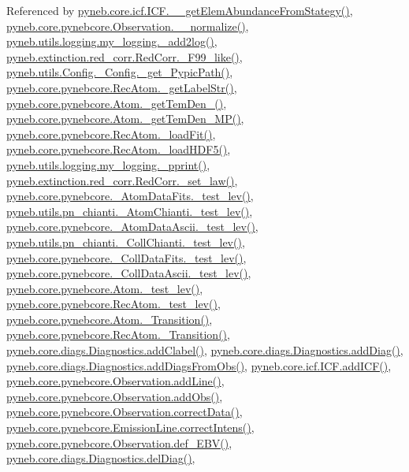 Referenced by \hyperlink{icf_8py_source_l01075}{pyneb.\-core.\-icf.\-I\-C\-F.\-\_\-\-\_\-get\-Elem\-Abundance\-From\-Stategy()}, \hyperlink{pynebcore_8py_source_l04007}{pyneb.\-core.\-pynebcore.\-Observation.\-\_\-\-\_\-normalize()}, \hyperlink{logging_8py_source_l00059}{pyneb.\-utils.\-logging.\-my\-\_\-logging.\-\_\-add2log()}, \hyperlink{red__corr_8py_source_l00658}{pyneb.\-extinction.\-red\-\_\-corr.\-Red\-Corr.\-\_\-\-F99\-\_\-like()}, \hyperlink{_config_8py_source_l00115}{pyneb.\-utils.\-Config.\-\_\-\-Config.\-\_\-get\-\_\-\-Pypic\-Path()}, \hyperlink{pynebcore_8py_source_l02970}{pyneb.\-core.\-pynebcore.\-Rec\-Atom.\-\_\-get\-Label\-Str()}, \hyperlink{pynebcore_8py_source_l01869}{pyneb.\-core.\-pynebcore.\-Atom.\-\_\-get\-Tem\-Den\-\_()}, \hyperlink{pynebcore_8py_source_l02046}{pyneb.\-core.\-pynebcore.\-Atom.\-\_\-get\-Tem\-Den\-\_\-\-M\-P()}, \hyperlink{pynebcore_8py_source_l02754}{pyneb.\-core.\-pynebcore.\-Rec\-Atom.\-\_\-load\-Fit()}, \hyperlink{pynebcore_8py_source_l02714}{pyneb.\-core.\-pynebcore.\-Rec\-Atom.\-\_\-load\-H\-D\-F5()}, \hyperlink{logging_8py_source_l00051}{pyneb.\-utils.\-logging.\-my\-\_\-logging.\-\_\-pprint()}, \hyperlink{red__corr_8py_source_l00176}{pyneb.\-extinction.\-red\-\_\-corr.\-Red\-Corr.\-\_\-set\-\_\-law()}, \hyperlink{pynebcore_8py_source_l00178}{pyneb.\-core.\-pynebcore.\-\_\-\-Atom\-Data\-Fits.\-\_\-test\-\_\-lev()}, \hyperlink{pn__chianti_8py_source_l00304}{pyneb.\-utils.\-pn\-\_\-chianti.\-\_\-\-Atom\-Chianti.\-\_\-test\-\_\-lev()}, \hyperlink{pynebcore_8py_source_l00447}{pyneb.\-core.\-pynebcore.\-\_\-\-Atom\-Data\-Ascii.\-\_\-test\-\_\-lev()}, \hyperlink{pn__chianti_8py_source_l00472}{pyneb.\-utils.\-pn\-\_\-chianti.\-\_\-\-Coll\-Chianti.\-\_\-test\-\_\-lev()}, \hyperlink{pynebcore_8py_source_l00677}{pyneb.\-core.\-pynebcore.\-\_\-\-Coll\-Data\-Fits.\-\_\-test\-\_\-lev()}, \hyperlink{pynebcore_8py_source_l01045}{pyneb.\-core.\-pynebcore.\-\_\-\-Coll\-Data\-Ascii.\-\_\-test\-\_\-lev()}, \hyperlink{pynebcore_8py_source_l01525}{pyneb.\-core.\-pynebcore.\-Atom.\-\_\-test\-\_\-lev()}, \hyperlink{pynebcore_8py_source_l02672}{pyneb.\-core.\-pynebcore.\-Rec\-Atom.\-\_\-test\-\_\-lev()}, \hyperlink{pynebcore_8py_source_l01433}{pyneb.\-core.\-pynebcore.\-Atom.\-\_\-\-Transition()}, \hyperlink{pynebcore_8py_source_l02812}{pyneb.\-core.\-pynebcore.\-Rec\-Atom.\-\_\-\-Transition()}, \hyperlink{diags_8py_source_l00410}{pyneb.\-core.\-diags.\-Diagnostics.\-add\-Clabel()}, \hyperlink{diags_8py_source_l00246}{pyneb.\-core.\-diags.\-Diagnostics.\-add\-Diag()}, \hyperlink{diags_8py_source_l00353}{pyneb.\-core.\-diags.\-Diagnostics.\-add\-Diags\-From\-Obs()}, \hyperlink{icf_8py_source_l00797}{pyneb.\-core.\-icf.\-I\-C\-F.\-add\-I\-C\-F()}, \hyperlink{pynebcore_8py_source_l03558}{pyneb.\-core.\-pynebcore.\-Observation.\-add\-Line()}, \hyperlink{pynebcore_8py_source_l03589}{pyneb.\-core.\-pynebcore.\-Observation.\-add\-Obs()}, \hyperlink{pynebcore_8py_source_l04028}{pyneb.\-core.\-pynebcore.\-Observation.\-correct\-Data()}, \hyperlink{pynebcore_8py_source_l03447}{pyneb.\-core.\-pynebcore.\-Emission\-Line.\-correct\-Intens()}, \hyperlink{pynebcore_8py_source_l03983}{pyneb.\-core.\-pynebcore.\-Observation.\-def\-\_\-\-E\-B\-V()}, \hyperlink{diags_8py_source_l00336}{pyneb.\-core.\-diags.\-Diagnostics.\-del\-Diag()}, 